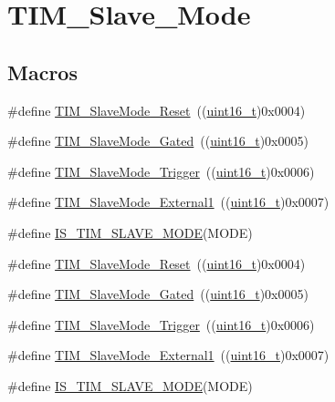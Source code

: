 \hypertarget{group___t_i_m___slave___mode}{}\section{T\+I\+M\+\_\+\+Slave\+\_\+\+Mode}
\label{group___t_i_m___slave___mode}
\subsection*{Macros}
\begin{DoxyCompactItemize}
\item 
\#define \hyperlink{group___t_i_m___slave___mode_gaac1cec731f1a5e680a038c4f472f74af}{T\+I\+M\+\_\+\+Slave\+Mode\+\_\+\+Reset}~((\hyperlink{_p_e___types_8h_a1f1825b69244eb3ad2c7165ddc99c956}{uint16\+\_\+t})0x0004)
\item 
\#define \hyperlink{group___t_i_m___slave___mode_ga1f36c870b926f70b32f274bbc0bc39a5}{T\+I\+M\+\_\+\+Slave\+Mode\+\_\+\+Gated}~((\hyperlink{_p_e___types_8h_a1f1825b69244eb3ad2c7165ddc99c956}{uint16\+\_\+t})0x0005)
\item 
\#define \hyperlink{group___t_i_m___slave___mode_ga9e7726c04ee1bafec97226f08adf5677}{T\+I\+M\+\_\+\+Slave\+Mode\+\_\+\+Trigger}~((\hyperlink{_p_e___types_8h_a1f1825b69244eb3ad2c7165ddc99c956}{uint16\+\_\+t})0x0006)
\item 
\#define \hyperlink{group___t_i_m___slave___mode_ga34427a693157ab177fead9871185bd35}{T\+I\+M\+\_\+\+Slave\+Mode\+\_\+\+External1}~((\hyperlink{_p_e___types_8h_a1f1825b69244eb3ad2c7165ddc99c956}{uint16\+\_\+t})0x0007)
\item 
\#define \hyperlink{group___t_i_m___slave___mode_ga7f0e666bc968c56df7f1f6c2465c89fb}{I\+S\+\_\+\+T\+I\+M\+\_\+\+S\+L\+A\+V\+E\+\_\+\+M\+O\+DE}(M\+O\+DE)
\item 
\#define \hyperlink{group___t_i_m___slave___mode_gaac1cec731f1a5e680a038c4f472f74af}{T\+I\+M\+\_\+\+Slave\+Mode\+\_\+\+Reset}~((\hyperlink{_p_e___types_8h_a1f1825b69244eb3ad2c7165ddc99c956}{uint16\+\_\+t})0x0004)
\item 
\#define \hyperlink{group___t_i_m___slave___mode_ga1f36c870b926f70b32f274bbc0bc39a5}{T\+I\+M\+\_\+\+Slave\+Mode\+\_\+\+Gated}~((\hyperlink{_p_e___types_8h_a1f1825b69244eb3ad2c7165ddc99c956}{uint16\+\_\+t})0x0005)
\item 
\#define \hyperlink{group___t_i_m___slave___mode_ga9e7726c04ee1bafec97226f08adf5677}{T\+I\+M\+\_\+\+Slave\+Mode\+\_\+\+Trigger}~((\hyperlink{_p_e___types_8h_a1f1825b69244eb3ad2c7165ddc99c956}{uint16\+\_\+t})0x0006)
\item 
\#define \hyperlink{group___t_i_m___slave___mode_ga34427a693157ab177fead9871185bd35}{T\+I\+M\+\_\+\+Slave\+Mode\+\_\+\+External1}~((\hyperlink{_p_e___types_8h_a1f1825b69244eb3ad2c7165ddc99c956}{uint16\+\_\+t})0x0007)
\item 
\#define \hyperlink{group___t_i_m___slave___mode_ga7f0e666bc968c56df7f1f6c2465c89fb}{I\+S\+\_\+\+T\+I\+M\+\_\+\+S\+L\+A\+V\+E\+\_\+\+M\+O\+DE}(M\+O\+DE)
\end{DoxyCompactItemize}


